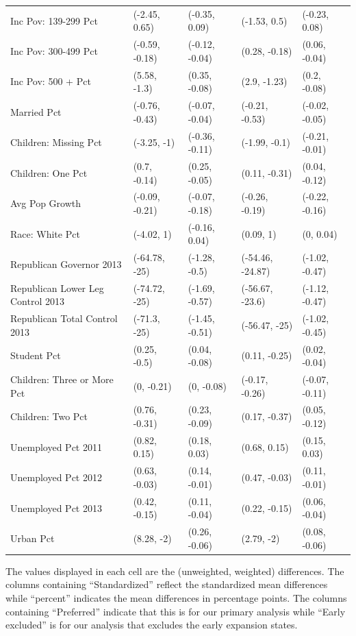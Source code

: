 \begin{landscape}
\begin{table}[h!]
\begin{threeparttable}
\begin{tabular}{lllll}
  Inc Pov: 139-299 Pct & (-2.45, 0.65) & (-0.35, 0.09) & (-1.53, 0.5) & (-0.23, 0.08) \\ 
  Inc Pov: 300-499 Pct & (-0.59, -0.18) & (-0.12, -0.04) & (0.28, -0.18) & (0.06, -0.04) \\ 
  Inc Pov: 500 + Pct & (5.58, -1.3) & (0.35, -0.08) & (2.9, -1.23) & (0.2, -0.08) \\ 
  Married Pct & (-0.76, -0.43) & (-0.07, -0.04) & (-0.21, -0.53) & (-0.02, -0.05) \\ 
  Children: Missing Pct & (-3.25, -1) & (-0.36, -0.11) & (-1.99, -0.1) & (-0.21, -0.01) \\ 
  Children: One Pct & (0.7, -0.14) & (0.25, -0.05) & (0.11, -0.31) & (0.04, -0.12) \\ 
  Avg Pop Growth & (-0.09, -0.21) & (-0.07, -0.18) & (-0.26, -0.19) & (-0.22, -0.16) \\ 
  Race: White Pct & (-4.02, 1) & (-0.16, 0.04) & (0.09, 1) & (0, 0.04) \\ 
  Republican Governor 2013 & (-64.78, -25) & (-1.28, -0.5) & (-54.46, -24.87) & (-1.02, -0.47) \\ 
  Republican Lower Leg Control 2013 & (-74.72, -25) & (-1.69, -0.57) & (-56.67, -23.6) & (-1.12, -0.47) \\ 
  Republican Total Control 2013 & (-71.3, -25) & (-1.45, -0.51) & (-56.47, -25) & (-1.02, -0.45) \\ 
  Student Pct & (0.25, -0.5) & (0.04, -0.08) & (0.11, -0.25) & (0.02, -0.04) \\ 
  Children: Three or More Pct & (0, -0.21) & (0, -0.08) & (-0.17, -0.26) & (-0.07, -0.11) \\ 
  Children: Two Pct & (0.76, -0.31) & (0.23, -0.09) & (0.17, -0.37) & (0.05, -0.12) \\ 
  Unemployed Pct 2011 & (0.82, 0.15) & (0.18, 0.03) & (0.68, 0.15) & (0.15, 0.03) \\ 
  Unemployed Pct 2012 & (0.63, -0.03) & (0.14, -0.01) & (0.47, -0.03) & (0.11, -0.01) \\ 
  Unemployed Pct 2013 & (0.42, -0.15) & (0.11, -0.04) & (0.22, -0.15) & (0.06, -0.04) \\ 
  Urban Pct & (8.28, -2) & (0.26, -0.06) & (2.79, -2) & (0.08, -0.06) \\ 
   \hline
\end{tabular}
    \begin{tablenotes}
      \item[] The values displayed in each cell are the (unweighted, weighted) differences. The columns containing ``Standardized'' reflect the standardized mean differences while ``percent'' indicates the mean differences in percentage points. The columns containing ``Preferred'' indicate that this is for our primary analysis while ``Early excluded'' is for our analysis that excludes the early expansion states.
    \end{tablenotes}
\end{threeparttable}
\end{table}

\end{landscape}


